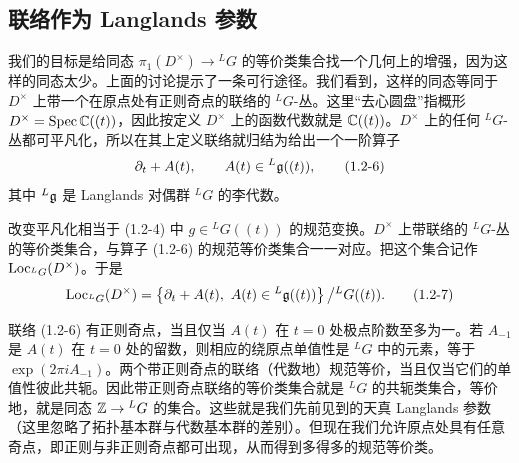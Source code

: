 \subsection{联络作为 Langlands 参数}

我们的目标是给同态 $\pi_1(D^\times)\to{}^L G$ 的等价类集合找一个几何上的增强，因为这样的同态太少。上面的讨论提示了一条可行途径。我们看到，这样的同态等同于 $D^\times$ 上带一个在原点处有正则奇点的联络的 ${}^L G$-丛。这里“去心圆盘”指概形 $D^\times=\operatorname{Spec}\mathbb{C}((t))$，因此按定义 $D^\times$ 上的函数代数就是 $\mathbb{C}((t))$。$D^\times$ 上的任何 ${}^L G$-丛都可平凡化，所以在其上定义联络就归结为给出一个一阶算子
\begin{equation}
    \partial_t+A(t),\qquad A(t)\in{}^L\mathfrak{g}((t)),
    \tag{1.2-6}
\end{equation}
其中 ${}^L\mathfrak{g}$ 是 Langlands 对偶群 ${}^L G$ 的李代数。

改变平凡化相当于 (1.2-4) 中 $g\in{}^L G((t))$ 的规范变换。$D^\times$ 上带联络的 ${}^L G$-丛的等价类集合，与算子 (1.2-6) 的规范等价类集合一一对应。把这个集合记作 $\operatorname{Loc}_{{}^L G}(D^\times)$。于是
\begin{equation}
    \operatorname{Loc}_{{}^L G}(D^\times)
    =\left\{\partial_t+A(t),\ A(t)\in{}^L\mathfrak{g}((t))\right\}\big/{}^L G((t)).
    \tag{1.2-7}
\end{equation}

联络 (1.2-6) 有正则奇点，当且仅当 $A(t)$ 在 $t=0$ 处极点阶数至多为一。若 $A_{-1}$ 是 $A(t)$ 在 $t=0$ 处的留数，则相应的绕原点单值性是 ${}^L G$ 中的元素，等于 $\exp(2\pi iA_{-1})$。两个带正则奇点的联络（代数地）规范等价，当且仅当它们的单值性彼此共轭。因此带正则奇点联络的等价类集合就是 ${}^L G$ 的共轭类集合，等价地，就是同态 $\mathbb{Z}\to{}^L G$ 的集合。这些就是我们先前见到的天真 Langlands 参数（这里忽略了拓扑基本群与代数基本群的差别）。但现在我们允许原点处具有任意奇点，即正则与非正则奇点都可出现，从而得到多得多的规范等价类。

